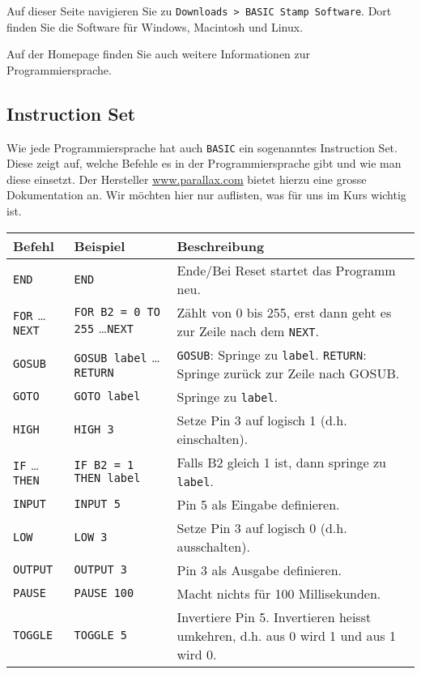 \noindent
Auf dieser Seite navigieren Sie zu \verb|Downloads > BASIC Stamp Software|.
Dort finden Sie die Software für Windows, Macintosh und Linux.

Auf der Homepage finden Sie auch weitere Informationen zur Programmiersprache.

\newpage
\subsection{Instruction Set}
Wie jede Programmiersprache hat auch \verb|BASIC| ein sogenanntes Instruction Set.
Diese zeigt auf, welche Befehle es in der Programmiersprache gibt und wie man 
diese einsetzt. Der Hersteller \url{www.parallax.com} bietet hierzu eine grosse
Dokumentation an. Wir möchten hier nur auflisten, was für uns im Kurs wichtig ist.

\begin{table}[h!]
\centering

\begin{tabular}{| l || l | p{4cm} | }
\rowcolor[gray]{0.5}
\hline
	\textbf{Befehl} 
	& \textbf{Beispiel} 
	& \textbf{Beschreibung} \\
\hline
\hline
	\verb|END| 
	& \verb|END| 
	& \footnotesize{Ende/Bei Reset startet das Programm neu.} \\ 
\hline
\rowcolor[gray]{0.8}
	\verb|FOR| \dots \verb|NEXT| 
	& \verb|FOR B2 = 0 TO 255| \dots \verb|NEXT| 
	& \footnotesize{Zählt von 0 bis 255, erst dann geht es zur Zeile nach dem \verb|NEXT|.} \\ 
\hline
	\verb|GOSUB| 
	& \verb|GOSUB label| \dots \verb|RETURN|
	& \footnotesize{\verb|GOSUB|: Springe zu \verb|label|. \verb|RETURN|: Springe zurück zur Zeile nach GOSUB.} \\
\hline
\rowcolor[gray]{0.8}
	\verb|GOTO| 
	& \verb|GOTO label| 
	& \footnotesize{Springe zu \verb|label|.} \\
\hline
	\verb|HIGH|
	& \verb|HIGH 3| 
	& \footnotesize{Setze Pin 3 auf logisch 1 (d.h. einschalten).} \\
\hline
\rowcolor[gray]{0.8}
	\verb|IF| \dots \verb|THEN|
	& \verb|IF B2 = 1 THEN label|
	& \footnotesize{Falls B2 gleich 1 ist, dann springe zu \verb|label|.} \\
\hline
	\verb|INPUT| 
	& \verb|INPUT 5| 
	& \footnotesize{Pin 5 als Eingabe definieren.} \\
\hline
\rowcolor[gray]{0.8}
	\verb|LOW|
	& \verb|LOW 3| 
	& \footnotesize{Setze Pin 3 auf logisch 0 (d.h. ausschalten).} \\
\hline
	\verb|OUTPUT| 
	& \verb|OUTPUT 3| 
	& \footnotesize{Pin 3 als Ausgabe definieren.} \\
\hline
\rowcolor[gray]{0.8}
	\verb|PAUSE| 
	& \verb|PAUSE 100| 
	& \footnotesize{Macht nichts für 100 Millisekunden.} \\
\hline
	\verb|TOGGLE|
	& \verb|TOGGLE 5| 
	& \footnotesize{Invertiere Pin 5. Invertieren heisst umkehren, d.h. aus 0 wird 1 und aus 1 wird 0.} \\
\hline
\end{tabular} 
\end{table}

